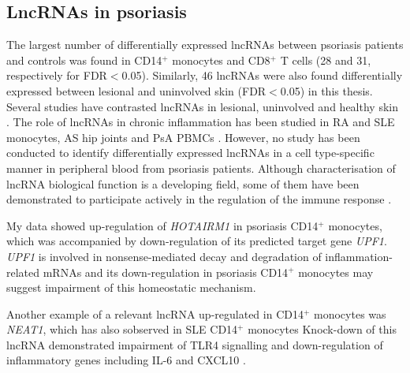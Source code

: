 \subsection{LncRNAs in psoriasis}
The largest number of differentially expressed lncRNAs between psoriasis patients and controls was found in CD14$^+$ monocytes and CD8$^+$ T cells (28 and 31, respectively for FDR$<$0.05). Similarly, 46 lncRNAs were also found differentially expressed between lesional and uninvolved skin (FDR$<$0.05) in this thesis. Several studies have contrasted lncRNAs in lesional, uninvolved and healthy skin \parencite{Li2014,Gupta2016,Ahn2016,Tsoi2015}. The role of lncRNAs in chronic inflammation has been studied in RA and SLE monocytes, AS hip joints and PsA PBMCs \parencite{Muller2014,Shi2014,Zhang2017, Dolcino2018}. However, no study has been conducted to identify differentially expressed lncRNAs in a cell type-specific manner in peripheral blood from psoriasis patients. Although characterisation of lncRNA biological function is a developing field, some of them have been demonstrated to participate actively in the regulation of the immune response \parencite{Heward2014}. 

 My data showed up-regulation of \textit{HOTAIRM1} in psoriasis CD14$^+$ monocytes, which was accompanied by down-regulation of its predicted target gene \textit{UPF1}. \textit{UPF1} is involved in nonsense-mediated decay and degradation of inflammation-related mRNAs \parencite{Mino2015} and its down-regulation in psoriasis CD14$^+$ monocytes may suggest impairment of this homeostatic mechanism. 
 
 Another example of a relevant lncRNA up-regulated in CD14$^+$ monocytes was \textit{NEAT1}, which has also sobserved in SLE CD14$^+$ monocytes \parencite{Zhang2016} Knock-down of this lncRNA demonstrated impairment of TLR4 signalling and down-regulation of inflammatory genes including IL-6 and CXCL10 \parencite{Zhang2016}. %

